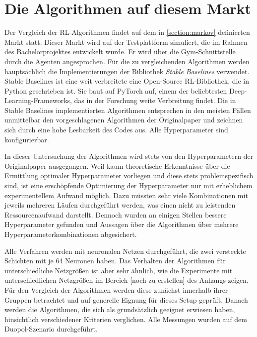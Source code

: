 \section{Die Algorithmen auf diesem Markt}
Der Vergleich der RL-Algorithmen findet auf dem in \ref{section:markov} definierten Markt statt.
Dieser Markt wird auf der Testplattform simuliert, die im Rahmen des Bachelorprojektes entwickelt wurde.
Er wird über die Gym-Schnittstelle durch die Agenten angesprochen.
Für die zu vergleichenden Algorithmen werden hauptsächlich die Implementierungen der Bibliothek \textit{Stable Baselines} verwendet. \cite{stable-baselines}
Stable Baselines ist eine weit verbreitete eine Open-Source RL-Bibliothek, die in Python geschrieben ist.
Sie baut auf PyTorch auf, einem der beliebtesten Deep-Learning-Frameworks, das in der Forschung weite Verbreitung findet. \cite{NEURIPS2019_9015}
Die in Stable Baselines implementierten Algorithmen entsprechen in den meisten Fällen unmittelbar den vorgeschlagenen Algorithmen der Originalpaper und zeichnen sich durch eine hohe Lesbarkeit des Codes aus.
Alle Hyperparameter sind konfigurierbar.

In dieser Untersuchung der Algorithmen wird stets von den Hyperparametern der Originalpaper ausgegangen.
Weil kaum theoretische Erkenntnisse über die Ermittlung optimaler Hyperparameter vorliegen und diese stets problemspezifisch sind, ist eine erschöpfende Optimierung der Hyperparameter nur mit erheblichem experimentellem Aufwand möglich.
Dazu müssten sehr viele Kombinationen mit jeweils mehreren Läufen durchgeführt werden, was einen nicht zu leistenden Ressourcenaufwand darstellt.
Dennoch wurden an einigen Stellen bessere Hyperparameter gefunden und Aussagen über die Algorithmen über mehrere Hyperparameterkombinationen abgesichert.

Alle Verfahren werden mit neuronalen Netzen durchgeführt, die zwei versteckte Schichten mit je 64 Neuronen haben.
Das Verhalten der Algorithmen für unterschiedliche Netzgrößen ist aber sehr ähnlich, wie die Experimente mit unterschiedlichen Netzgrößen im Bereich [noch zu erstellen] des Anhangs zeigen.
Für den Vergleich der Algorithmen werden diese zunächst innerhalb ihrer Gruppen betrachtet und auf generelle Eignung für dieses Setup geprüft.
Danach werden die Algorithmen, die sich als grundsätzlich geeignet erwiesen haben, hinsichtlich verschiedener Kriterien verglichen.
Alle Messungen wurden auf dem Duopol-Szenario durchgeführt.

